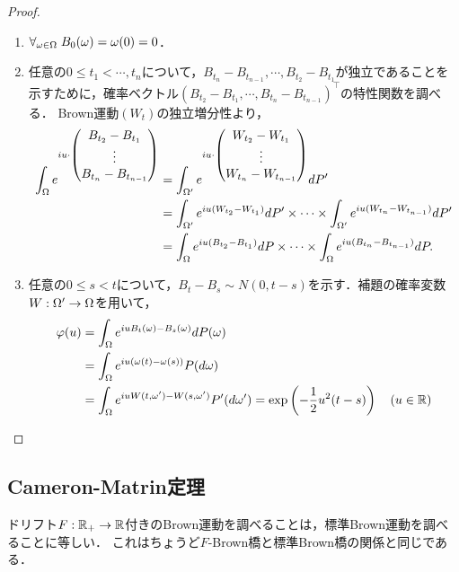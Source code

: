 \documentclass[uplatex,dvipdfmx]{jsreport}
\begin{document}
\begin{proof}
\begin{enumerate}
        \begin{enumerate}[({B}1)]
            \item $\forall_{\omega\in\Omega}\;B_0(\omega)=\omega(0)=0$．
            \item 任意の$0\le t_1<\cdots,t_n$について，$B_{t_n}-B_{t_{n-1}},\cdots,B_{t_2}-B_{t_1}$が独立であることを示すために，確率ベクトル$(B_{t_2}-B_{t_1},\cdots,B_{t_n}-B_{t_{n-1}})^\top$の特性関数を調べる．
            Brown運動$(W_t)$の独立増分性より，
            \begin{align*}
                \int_\Omega e^{iu\cdot \begin{pmatrix}B_{t_2}-B_{t_1}\\\vdots\\B_{t_n}-B_{t_{n-1}}\end{pmatrix}}&=\int_{\Omega'}e^{iu\cdot \begin{pmatrix}W_{t_2}-W_{t_1}\\\vdots\\W_{t_n}-W_{t_{n-1}}\end{pmatrix}}dP'\\
                &=\int_{\Omega'}e^{iu(W_{t_2}-W_{t_1})}dP'\times\cdots\times\int_{\Omega'}e^{iu(W_{t_n}-W_{t_{n-1}})}dP'\\
                &=\int_\Omega e^{iu(B_{t_2}-B_{t_1})}dP\times\cdots\times\int_\Omega e^{iu(B_{t_n}-B_{t_{n-1}})}dP.
            \end{align*}
            \item 任意の$0\le s<t$について，$B_t-B_s\sim N(0,t-s)$を示す．補題の確率変数$W:\Omega'\to\Omega$を用いて，
            \begin{align*}
                \varphi(u)&=\int_\Omega e^{iuB_t(\omega)-B_s(\omega)}dP(\omega)\\
                &=\int_\Omega e^{iu(\omega(t)-\omega(s))}P(d\omega)\\
                &=\int_\Omega e^{iu W(t,\omega')-W(s,\omega')}P'(d\omega')=\exp\left(-\frac{1}{2}u^2(t-s)\right)\quad(u\in\mathbb{R})
            \end{align*}
        \end{enumerate}
    \end{enumerate}
\end{proof}

\subsection{Cameron-Matrin定理}

\begin{tcolorbox}[colframe=ForestGreen, colback=ForestGreen!10!white,breakable,colbacktitle=ForestGreen!40!white,coltitle=black,fonttitle=\bfseries\sffamily,
title=]
    ドリフト$F:\mathbb{R}_+\to\mathbb{R}$付きのBrown運動を調べることは，標準Brown運動を調べることに等しい．
    これはちょうど$F$-Brown橋と標準Brown橋の関係と同じである．
\end{tcolorbox}
\end{document}
